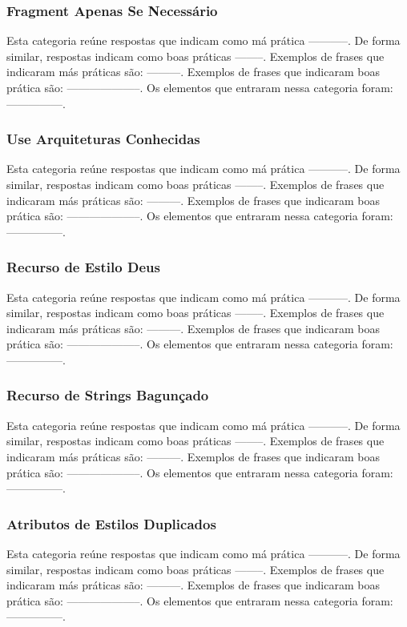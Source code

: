 \subsubsection{Fragment Apenas Se Necess\'ario}
Esta categoria re\'une respostas que indicam como m\'a pr\'atica -----------. De forma similar, respostas indicam como boas pr\'aticas --------. Exemplos de frases que indicaram m\'as pr\'aticas s\~ao: ---------. Exemplos de frases que indicaram boas pr\'atica s\~ao: --------------------. Os elementos que entraram nessa categoria foram: ---------------. 

\subsubsection{Use Arquiteturas Conhecidas}
Esta categoria re\'une respostas que indicam como m\'a pr\'atica -----------. De forma similar, respostas indicam como boas pr\'aticas --------. Exemplos de frases que indicaram m\'as pr\'aticas s\~ao: ---------. Exemplos de frases que indicaram boas pr\'atica s\~ao: --------------------. Os elementos que entraram nessa categoria foram: ---------------. 

\subsubsection{Recurso de Estilo Deus}
Esta categoria re\'une respostas que indicam como m\'a pr\'atica -----------. De forma similar, respostas indicam como boas pr\'aticas --------. Exemplos de frases que indicaram m\'as pr\'aticas s\~ao: ---------. Exemplos de frases que indicaram boas pr\'atica s\~ao: --------------------. Os elementos que entraram nessa categoria foram: ---------------. 

\subsubsection{Recurso de Strings Bagun\c{c}ado}
Esta categoria re\'une respostas que indicam como m\'a pr\'atica -----------. De forma similar, respostas indicam como boas pr\'aticas --------. Exemplos de frases que indicaram m\'as pr\'aticas s\~ao: ---------. Exemplos de frases que indicaram boas pr\'atica s\~ao: --------------------. Os elementos que entraram nessa categoria foram: ---------------. 

\subsubsection{Atributos de Estilos Duplicados}
Esta categoria re\'une respostas que indicam como m\'a pr\'atica -----------. De forma similar, respostas indicam como boas pr\'aticas --------. Exemplos de frases que indicaram m\'as pr\'aticas s\~ao: ---------. Exemplos de frases que indicaram boas pr\'atica s\~ao: --------------------. Os elementos que entraram nessa categoria foram: ---------------. 




